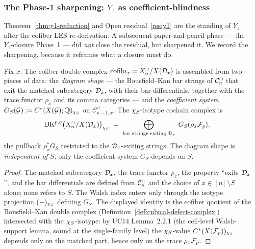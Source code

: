 \subsubsection{The Phase-1 sharpening: $Y_1$ as coefficient-blindness}

Theorem~\ref{thm:y1-reduction} and Open residual~\ref{res:y1} are the
standing of $Y_1$ after the cofiber-LES re-derivation. A subsequent
paper-and-pencil phase --- the $Y_1$-closure Phase~1 --- did \emph{not}
close the residual, but sharpened it. We record the sharpening, because it
reframes what a closure must do.

\begin{proposition}
\label{prop:y1-S-independent}
Fix $x$. The cofiber double complex $\mathrm{cofib}\iota_x=X^{\cap}_n/X(\mathcal{D}_x)$ is
assembled from two pieces of data: the \emph{diagram shape} --- the
Bousfield--Kan bar strings of $\mathcal{C}^{\cap}_n$ that exit the matched subcategory
$\mathcal{D}_x$, with their bar differentials, together with the trace functor
$\rho_x$ and its comma categories --- and the \emph{coefficient system}
$G_S(\mathcal{G}):=C^*(X(\mathcal{G});\mathbb{Q})_{\chi_{S}}$ on $\mathcal C^{\cap}_{n-1,x}$. The
$\chi_{S}$-isotype cochain complex is
\[
  \mathrm{BK}^{p,q}\bigl(X^{\cap}_n/X(\mathcal{D}_x)\bigr)_{\chi_{S}}\;=\;
  \bigoplus_{\text{bar strings exiting }\mathcal{D}_x}\;G_S(\rho_x\mathcal{F}_p),
\]
the pullback $\rho_x^{*}G_S$ restricted to the $\mathcal{D}_x$-exiting strings. The
diagram shape is \emph{independent of $S$}; only the coefficient system
$G_S$ depends on $S$.
\end{proposition}

\begin{proof}
The matched subcategory $\mathcal{D}_x$, the trace functor $\rho_x$, the property
``exits $\mathcal{D}_x$'', and the bar differentials are defined from $\mathcal{C}^{\cap}_n$ and the
choice of $x\in[n]\setminus S$ alone; none refers to $S$. The Walsh index
enters only through the isotype projection $(-)_{\chi_{S}}$ defining
$G_S$. The displayed identity is the cofiber quotient of the
Bousfield--Kan double complex (Definition~\ref{def:cubical-defect-complex})
intersected with the $\chi_{S}$-isotype: by UC14 Lemma~2.2.1 (the
cell-level Walsh-support lemma, sound at the single-family level) the
$\chi_{S}$-value $C^*(X(\mathcal{F}_p))_{\chi_{S}}$ depends only on the matched
part, hence only on the trace $\rho_x\mathcal{F}_p$.
\end{proof}

